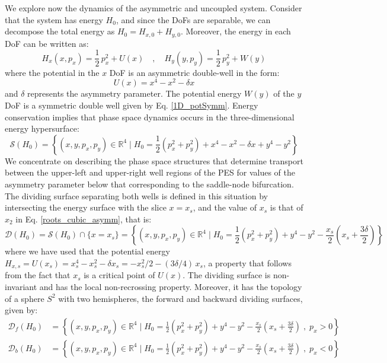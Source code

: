 \documentclass[10pt,aps,onecolumn,superscriptaddress]{revtex4-2}
\begin{document}
We explore now the dynamics of the asymmetric and uncoupled system. Consider that the system has energy $H_0$, and since the DoFs are separable, we can decompose the total energy as $H_0 = H_{x,0} + H_{y,0}$. Moreover, the energy in each DoF can be written as:
\begin{equation}\label{eqasymun}
	H_{x}(x,p_x) = \frac{1}{2} \, p_x^2 + U(x) \quad,\quad H_{y}(y,p_y) = \frac{1}{2} \, p_y^2 + W(y)
\end{equation}
where the potential in the $x$ DoF is an asymmetric double-well in the form:
\begin{equation}\label{potasymun}
	U(x) = x^4 - x^2 - \delta x
\end{equation}
and $\delta$ represents the asymmetry parameter. The potential energy $W(y)$ of the $y$ DoF is a symmetric double well given by Eq. \eqref{1D_potSymm}. Energy conservation implies that phase space dynamics occurs in the three-dimensional energy hypersurface:
\begin{equation}
\mathcal{S}(H_0) = \left\{ (x,y,p_x,p_y) \in \mathbb{R}^4 \; | \; H_0 = \frac{1}{2}\left(p_x^2+p_y^2\right) + x^4 - x^2 - \delta x + y^4 - y^2 \right\}
\end{equation}
We concentrate on describing the phase space structures that determine transport between the upper-left and upper-right well regions of the PES for values of the asymmetry parameter below that corresponding to the saddle-node bifurcation. The dividing surface separating both wells is defined in this situation by intersecting the energy surface with the slice $x = x_s$, and the value of $x_s$ is that of $x_2$ in Eq. \eqref{roots_cubic_asymm}, that is:
\begin{equation}
\mathcal{D}\left(H_0\right) = \mathcal{S}\left(H_0\right) \cap \lbrace x = x_{s} \rbrace = \left\{(x,y,p_x,p_y) \in \mathbb{R}^4 \; \bigg| \; H_0 = \frac{1}{2}\left(p_x^2+p_y^2\right) + y^4 - y^2 - \frac{x_s}{2} \left(x_s + \frac{3\delta}{2}\right) \right\}
\label{ds_asym_unc}
\end{equation}
where we have used that the potential energy $H_{x,s} = U(x_s) = x_s^4 - x_s^2 - \delta x_s = -x_s^2/2 - (3\delta/4) \, x_s$, a property that follows from the fact that $x_s$ is a critical point of $U(x)$. The dividing surface is non-invariant and has the local non-recrossing property. Moreover, it has the topology of a sphere $S^2$ with two hemispheres, the forward and backward dividing surfaces, given by:
\begin{equation}
\begin{split}
\mathcal{D}_{f}(H_0) &= \left\{(x,y,p_x,p_y) \in \mathbb{R}^4 \; \bigg| \; H_0 = \frac{1}{2}\left(p_x^2+p_y^2\right) + y^4 - y^2 - \frac{x_s}{2} \left(x_s + \frac{3\delta}{2}\right) \;,\; p_x > 0 \right\} \\
\mathcal{D}_{b}(H_0) &= \left\{(x,y,p_x,p_y) \in \mathbb{R}^4 \; \bigg| \; H_0 = \frac{1}{2}\left(p_x^2+p_y^2\right) + y^4 - y^2 - \frac{x_s}{2} \left(x_s + \frac{3\delta}{2}\right) \;,\; p_x < 0 \right\}
\end{split}
\end{equation}
\end{document}
